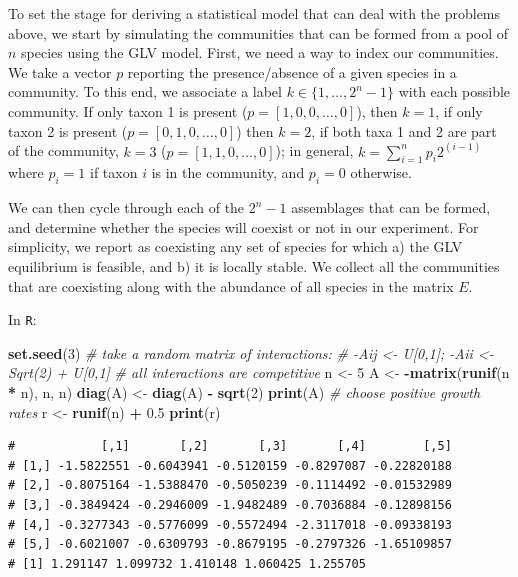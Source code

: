 \documentclass[]{book}
\newenvironment{Shaded}{\begin{snugshade}}{\end{snugshade}}
\newcommand{\CommentTok}[1]{\textcolor[rgb]{0.56,0.35,0.01}{\textit{#1}}}
\newcommand{\DecValTok}[1]{\textcolor[rgb]{0.00,0.00,0.81}{#1}}
\newcommand{\FloatTok}[1]{\textcolor[rgb]{0.00,0.00,0.81}{#1}}
\newcommand{\KeywordTok}[1]{\textcolor[rgb]{0.13,0.29,0.53}{\textbf{#1}}}
\newcommand{\NormalTok}[1]{#1}
\newcommand{\OperatorTok}[1]{\textcolor[rgb]{0.81,0.36,0.00}{\textbf{#1}}}
\newcommand{\StringTok}[1]{\textcolor[rgb]{0.31,0.60,0.02}{#1}}
\begin{document}
To set the stage for deriving a statistical model that can deal with the problems above, we start by simulating the communities that can be formed from a pool of \(n\) species using the GLV model. First, we need a way to index our communities. We take a vector \(p\) reporting the presence/absence of a given species in a community. To this end, we associate a label \(k \in \{1, \ldots, 2^n -1\}\) with each possible community. If only taxon 1 is present (\(p = [1,0,0,\ldots,0]\)), then \(k = 1\), if only taxon 2 is present (\(p =[0,1,0,\ldots,0]\)) then \(k = 2\), if both taxa 1 and 2 are part of the community, \(k = 3\) (\(p = [1,1,0,\ldots,0]\)); in general, \(k = \sum_{i = 1}^n p_i 2^{(i-1)}\) where \(p_i = 1\) if taxon \(i\) is in the community, and \(p_i = 0\) otherwise.

We can then cycle through each of the \(2^n - 1\) assemblages that can be formed, and determine whether the species will coexist or not in our experiment. For simplicity, we report as coexisting any set of species for which a) the GLV equilibrium is feasible, and b) it is locally stable. We collect all the communities that are coexisting along with the abundance of all species in the matrix \(E\).

In \texttt{R}:

\begin{Shaded}
\begin{Highlighting}[]
\KeywordTok{set.seed}\NormalTok{(}\DecValTok{3}\NormalTok{)}
\CommentTok{# take a random matrix of interactions: }
\CommentTok{# -Aij <- U[0,1]; -Aii <- Sqrt(2) + U[0,1]}
\CommentTok{# all interactions are competitive}
\NormalTok{n <-}\StringTok{ }\DecValTok{5}
\NormalTok{A <-}\StringTok{ }\OperatorTok{-}\KeywordTok{matrix}\NormalTok{(}\KeywordTok{runif}\NormalTok{(n }\OperatorTok{*}\StringTok{ }\NormalTok{n), n, n)}
\KeywordTok{diag}\NormalTok{(A) <-}\StringTok{ }\KeywordTok{diag}\NormalTok{(A) }\OperatorTok{-}\StringTok{ }\KeywordTok{sqrt}\NormalTok{(}\DecValTok{2}\NormalTok{)}
\KeywordTok{print}\NormalTok{(A)}
\CommentTok{# choose positive growth rates}
\NormalTok{r <-}\StringTok{ }\KeywordTok{runif}\NormalTok{(n) }\OperatorTok{+}\StringTok{ }\FloatTok{0.5}
\KeywordTok{print}\NormalTok{(r)}
\end{Highlighting}
\end{Shaded}

\begin{verbatim}
#            [,1]       [,2]       [,3]       [,4]        [,5]
# [1,] -1.5822551 -0.6043941 -0.5120159 -0.8297087 -0.22820188
# [2,] -0.8075164 -1.5388470 -0.5050239 -0.1114492 -0.01532989
# [3,] -0.3849424 -0.2946009 -1.9482489 -0.7036884 -0.12898156
# [4,] -0.3277343 -0.5776099 -0.5572494 -2.3117018 -0.09338193
# [5,] -0.6021007 -0.6309793 -0.8679195 -0.2797326 -1.65109857
# [1] 1.291147 1.099732 1.410148 1.060425 1.255705
\end{verbatim}
\end{document}

